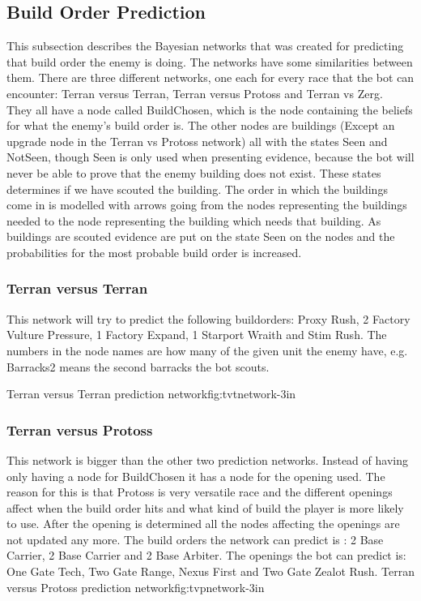 \subsection{Build Order Prediction}
	This subsection describes the Bayesian networks that was created for predicting that build order the enemy is doing. 
	The networks have some similarities between them. There are three different networks, one each for every race that the bot can encounter: 
	Terran versus Terran, Terran versus Protoss and Terran vs Zerg.  \\
	
	They all have a node called BuildChosen, which is the node containing the beliefs for what the enemy's build order is. 
	The other nodes are buildings (Except an upgrade node in the Terran vs Protoss network) all with the states Seen and NotSeen, 
	though Seen is only used when presenting evidence, because the bot will never be able to prove that the enemy building does not exist. 
	These states determines if we have scouted the building. 
	The order in which the buildings come in is modelled with arrows going from the nodes representing the buildings needed to the node 
	representing the building which needs that building. 
	As buildings are scouted evidence are put on the state Seen on the nodes and the probabilities for the most probable build order is increased.

\subsubsection{Terran versus Terran}
	This network will try to predict the following buildorders: Proxy Rush, 2 Factory Vulture Pressure, 1 Factory Expand, 1 Starport Wraith and Stim Rush. 
	The numbers in the node names are how many of the given unit the enemy have, e.g. Barracks2 means the second barracks the bot scouts. 
	
			{Terran versus Terran prediction network}{fig:tvtnetwork}{-3in}	
			
\subsubsection{Terran versus Protoss}
	This network is bigger than the other two prediction networks. Instead of having only having a node for BuildChosen it has a node for the opening 
	used. The reason for this is that Protoss is very versatile race and the different openings affect when the build order hits and what kind of build 
	the player is more likely to use. After the opening is determined all the nodes affecting the openings are not updated any more. The build orders 
	the network can predict is : 2 Base Carrier, 2 Base Carrier and 2 Base Arbiter. The openings the bot can predict is: One Gate Tech, Two Gate Range, 
	Nexus First and Two Gate Zealot Rush.
			{Terran versus Protoss prediction network}{fig:tvpnetwork}{-3in}


